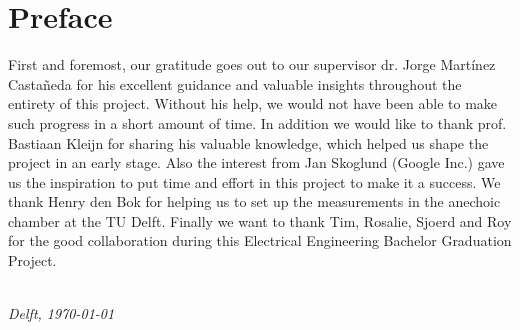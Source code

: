 \chapter*{Preface}

First and foremost, our gratitude goes out to our supervisor dr. Jorge Mart\'inez Casta\~neda for his excellent guidance and valuable insights throughout the entirety of this project. Without his help, we would not have been able to make such progress in a short amount of time. In addition we would like to thank prof. Bastiaan Kleijn for sharing his valuable knowledge, which helped us shape the project in an early stage. Also the interest from Jan Skoglund (Google Inc.) gave us the inspiration to put time and effort in this project to make it a success. We thank Henry den Bok for helping us to set up the measurements in the anechoic chamber at the TU Delft. Finally we want to thank Tim, Rosalie, Sjoerd and Roy for the good collaboration during this Electrical Engineering Bachelor Graduation Project.

\begin{flushright}
{\makeatletter\itshape
    \@author \\
    Delft, \today
\makeatother}
\end{flushright}

